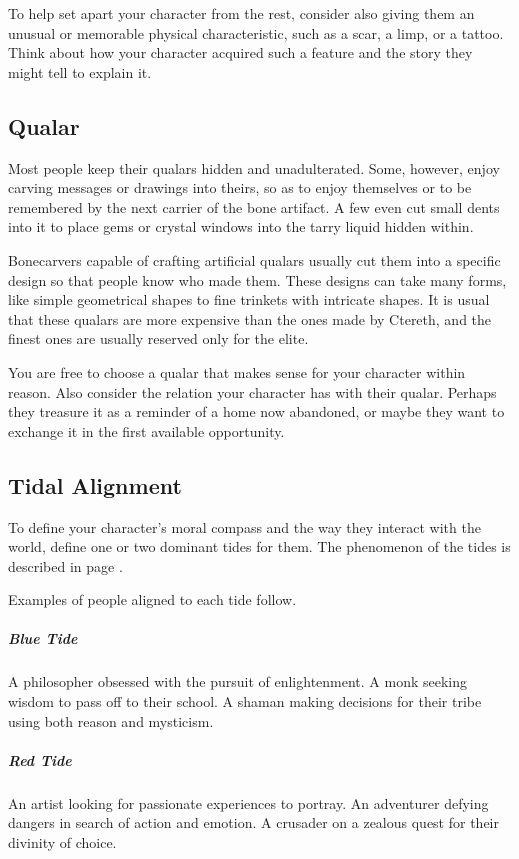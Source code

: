     To help set apart your character from the rest, consider also giving them an unusual or memorable physical characteristic, such as a scar, a limp, or a tattoo.
    Think about how your character acquired such a feature and the story they might tell to explain it.

\subsection*{Qualar}
    Most people keep their qualars hidden and unadulterated.
    Some, however, enjoy carving messages or drawings into theirs, so as to enjoy themselves or to be remembered by the next carrier of the bone artifact.
    A few even cut small dents into it to place gems or crystal windows into the tarry liquid hidden within.

    Bonecarvers capable of crafting artificial qualars usually cut them into a specific design so that people know who made them.
    These designs can take many forms, like simple geometrical shapes to fine trinkets with intricate shapes.
    It is usual that these qualars are more expensive than the ones made by Ctereth, and the finest ones are usually reserved only for the elite.

    You are free to choose a qualar that makes sense for your character within reason.
    Also consider the relation your character has with their qualar.
    Perhaps they treasure it as a reminder of a home now abandoned, or maybe they want to exchange it in the first available opportunity.

\subsection*{Tidal Alignment}
    To define your character's moral compass and the way they interact with the world, define one or two dominant tides for them.
    The phenomenon of the tides is described in page \pageref{ssec::tides}.

    Examples of people aligned to each tide follow.

    \subparagraph{Blue Tide} A philosopher obsessed with the pursuit of enlightenment.
        A monk seeking wisdom to pass off to their school.
        A shaman making decisions for their tribe using both reason and mysticism.

    \subparagraph{Red Tide} An artist looking for passionate experiences to portray.
        An adventurer defying dangers in search of action and emotion.
        A crusader on a zealous quest for their divinity of choice.


